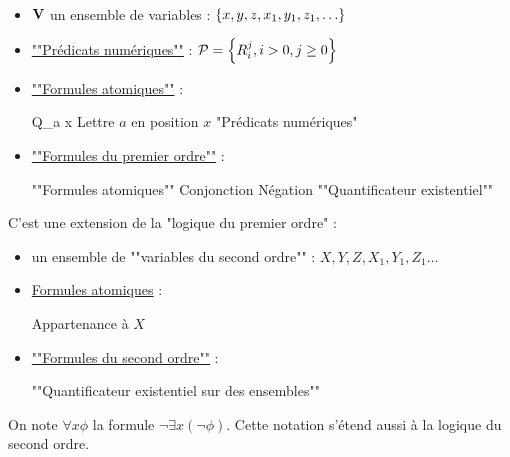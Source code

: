 \begin{definition} 
	\ \newline
	\begin{itemize}
		\item $\mathbf{V}$ un ensemble de variables : $\left\{x,y,z,x_1,y_1,z_1, \ldots\right\}$
		\item \underline{""Prédicats numériques""} :  $\mathcal{P} = \left\{R_i^j, i > 0, j \geq 0\right\}$
		\item \underline{""Formules atomiques""} :
		      \begin{syntaxdef}
			      \syntaxHeader {\alpha} {Q_a x} {Lettre $a$ en position $x$}
			       {"Prédicats numériques"}
		      \end{syntaxdef}
		\item \underline{""Formules du premier ordre""} :
		      \begin{syntaxdef}
			      \syntaxHeader {\phi} {\alpha} {""Formules atomiques""}
			      \syntax {\phi \land \phi} {Conjonction}
			      \syntax {\lnot \phi} {Négation}
			       {""Quantificateur existentiel""}
		      \end{syntaxdef}
	\end{itemize}
\end{definition}


\begin{definition} 
	C'est une extension de la "logique du premier ordre" :
	\begin{itemize}
		\item un ensemble de ""variables du second ordre"" : $X,Y,Z,X_1,Y_1,Z_1 \ldots$
		\item \underline{Formules atomiques} :
		      \begin{syntaxdef}
			      \syntaxExtension{\alpha}
			       {Appartenance à $X$}
		      \end{syntaxdef}
		\item \underline{""Formules du second ordre""} :
		      \begin{syntaxdef}
			      \syntaxExtension{\phi}
			       {""Quantificateur existentiel sur des ensembles""}
		      \end{syntaxdef}
	\end{itemize}
\end{definition}


\begin{notation}
	On note $\forall x \phi$ la formule $\lnot \exists x (\lnot \phi)$. Cette notation s'étend aussi
	à la logique du second ordre.
\end{notation}


